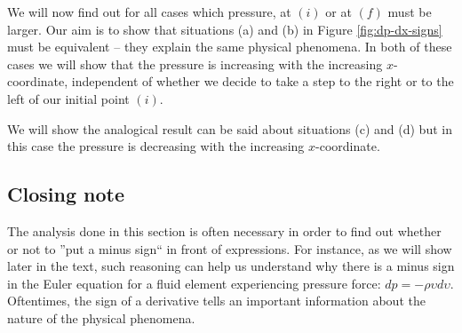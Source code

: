 We will now find out for all cases which pressure, at \textcolor{myblue}{$(i)$} or at \textcolor{myblue}{$(f)$} must be larger. Our aim is to show that situations (a) and (b) in Figure \ref{fig:dp-dx-signs} must be equivalent -- they explain the same physical phenomena. In both of these cases we will show that the pressure is increasing with the increasing $x$-coordinate, independent of whether we decide to take a step to the right or to the left of our initial point \textcolor{myblue}{$(i)$}. 

We will show the analogical result can be said about situations (c) and (d) but in this case the pressure is decreasing with the increasing $x$-coordinate.



\subsection{Closing note}

The analysis done in this section is often necessary in order to find out whether or not to ''put a minus sign`` in front of expressions. For instance, as we will show later in the text, such reasoning can help us understand why there is a minus sign in the Euler equation for a fluid element experiencing pressure force: $dp = - \rho \upsilon d \upsilon$. Oftentimes, the sign of a derivative tells an important information about the nature of the physical phenomena.






